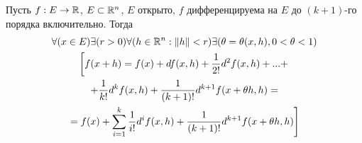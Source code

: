 \begin{teorema}
Пусть $f:E\to\mathbb{R}$, $E\subset\mathbb{R}^n$, $E$ открыто, $f$ дифференцируема на $E$ до $(k+1)$-го порядка включительно.
Тогда
\begin{multline}
\forall(x\in E)\exists(r>0)\forall(h\in\mathbb{R}^n:\|h\|<r)\exists(\theta=\theta(x,h), 0<\theta<1)
\\
\left[
	f(x+h)=f(x)+df(x,h)+\frac{1}{2!}d^2 f(x,h)+ ... + \right. \\  +\frac{1}{k!}d^k f(x,h)+\frac{1}{(k+1)!}d^{k+1} f(x+\theta h,h) = \\ \left.=
	f(x)+\sum_{i=1}^k\frac{1}{i!} d^i f(x,h) + \frac{1}{(k+1)!} d^{k+1} f(x+\theta h,h)
\right] 
\end{multline}
\end{teorema}

